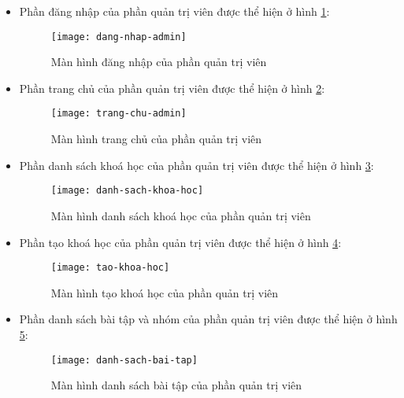 \documentclass[../Thesis.tex]{subfiles}
\begin{document}
            \begin{itemize}
                \item Phần đăng nhập của phần quản trị viên được thể hiện ở hình \ref{fig:dang-nhap-admin}:

                \begin{figure}[hbt!]
                    \centering\texttt{[image: dang-nhap-admin]}
                    \caption{Màn hình đăng nhập của phần quản trị viên}
                    \label{fig:dang-nhap-admin}
                \end{figure}
                \FloatBarrier

                \item Phần trang chủ của phần quản trị viên được thể hiện ở hình \ref{fig:trang-chu-admin}:
                \begin{figure}[hbt!]
                    \centering\texttt{[image: trang-chu-admin]}
                    \caption{Màn hình trang chủ của phần quản trị viên}
                    \label{fig:trang-chu-admin}
                \end{figure}
                \FloatBarrier

                \item Phần danh sách khoá học của phần quản trị viên được thể hiện ở hình \ref{fig:danh-sach-khoa-hoc}:
                \begin{figure}[hbt!]
                    \centering\texttt{[image: danh-sach-khoa-hoc]}
                    \caption{Màn hình danh sách khoá học của phần quản trị viên}
                    \label{fig:danh-sach-khoa-hoc}
                \end{figure}
                \FloatBarrier

                \item Phần tạo khoá học của phần quản trị viên được thể hiện ở hình \ref{fig:tao-khoa-hoc}:
                \begin{figure}[hbt!]
                    \centering\texttt{[image: tao-khoa-hoc]}
                    \caption{Màn hình tạo khoá học của phần quản trị viên}
                    \label{fig:tao-khoa-hoc}
                \end{figure}
                \FloatBarrier


                \item Phần danh sách bài tập và nhóm của phần quản trị viên được thể hiện ở hình \ref{fig:danh-sach-bai-tap}:
                \begin{figure}[hbt!]
                    \centering\texttt{[image: danh-sach-bai-tap]}
                    \caption{Màn hình danh sách bài tập của phần quản trị viên}
                    \label{fig:danh-sach-bai-tap}
                \end{figure}
                \FloatBarrier


\end{itemize}
\end{document}

